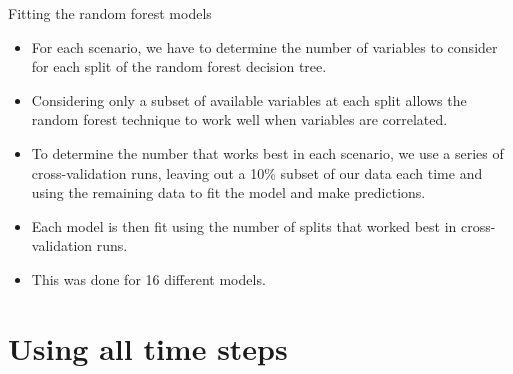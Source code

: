 \documentclass{beamer}
\begin{document}
\begin{frame}{Fitting the random forest models}

  {\footnotesize

    \begin{itemize}
  \item For each scenario, we have to determine the number of variables to consider for each split of the random forest decision tree.
  \item Considering only a subset of available variables at each split allows the random forest technique to work well when variables are correlated.
  \item To determine the number that works best in each scenario, we use a series of cross-validation runs, leaving out a 10\% subset of our data each time and using the remaining data to fit the model and make predictions.
    \item Each model is then fit using the number of splits that
      worked best in cross-validation runs.
      \item This was done for 16 different models.
    \end{itemize}
  }
  
\end{frame}



\section[All time steps]{Using all time steps}
\end{document}
